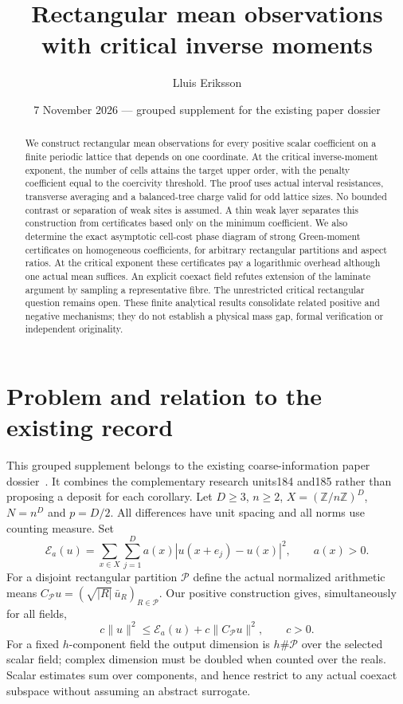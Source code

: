 \documentclass[11pt]{article}
\title{Rectangular mean observations with critical inverse moments}
\author{Lluis Eriksson}
\date{7 November 2026 --- grouped supplement for the existing paper dossier}
\newcommand{\E}{\mathcal E}
\newcommand{\Pcal}{\mathcal P}
\begin{document}
\maketitle
\begin{abstract}
We construct rectangular mean observations for every positive scalar
coefficient on a finite periodic lattice that depends on one coordinate.
At the critical inverse-moment exponent, the number of cells attains the
target upper order, with the penalty coefficient equal to the coercivity
threshold. The proof uses actual interval resistances, transverse averaging
and a balanced-tree charge valid for odd lattice sizes. No bounded contrast
or separation of weak sites is assumed. A thin weak layer separates this
construction from certificates based only on the minimum coefficient.
We also determine the exact asymptotic cell-cost phase diagram of strong
Green-moment certificates on homogeneous coefficients, for arbitrary
rectangular partitions and aspect ratios. At the critical exponent these
certificates pay a logarithmic overhead although one actual mean suffices.
An explicit coexact field refutes extension of the laminate argument by
sampling a representative fibre. The unrestricted critical rectangular
question remains open. These finite analytical results consolidate related
positive and negative mechanisms; they do not establish a physical mass gap,
formal verification or independent originality.
\end{abstract}

\section{Problem and relation to the existing record}
This grouped supplement belongs to the existing coarse-information paper
dossier~\cite{programme}. It combines the complementary research units184
and185 rather than proposing a deposit for each corollary. Let $D\ge3$,
$n\ge2$, $X=(\mathbb Z/n\mathbb Z)^D$, $N=n^D$ and $p=D/2$.
All differences have unit spacing and all norms use counting measure. Set
\[
 \E_a(u)=\sum_{x\in X}\sum_{j=1}^D
 a(x)|u(x+e_j)-u(x)|^2,\qquad a(x)>0.
\]
For a disjoint rectangular partition $\Pcal$ define the actual normalized
arithmetic means $C_{\Pcal}u=(\sqrt{|R|}\,\bar u_R)_{R\in\Pcal}$.
Our positive construction gives, simultaneously for all fields,
\begin{equation}\label{eq:goal}
 c\|u\|^2\le\E_a(u)+c\|C_{\Pcal}u\|^2,\qquad c>0.
\end{equation}
For a fixed $h$-component field the output dimension is $h\#\Pcal$ over
the selected scalar field; complex dimension must be doubled when counted
over the reals. Scalar estimates sum over components, and hence restrict
to any actual coexact subspace without assuming an abstract surrogate.
\end{document}
